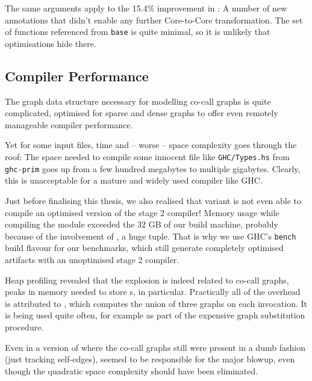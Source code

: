The same arguments apply to the 15.4\% improvement in :
A number of new annotations that didn't enable any further Core-to-Core transformation.
The set of functions referenced from \texttt{base} is quite minimal, so it is unlikely that optimisations hide there.

\subsection{Compiler Performance}\label{sec:compperf}

The graph data structure necessary for modelling co-call graphs is quite complicated, optimised for sparse and dense graphs to offer even remotely manageable compiler performance.

Yet for some input files, time and -- worse -- space complexity goes through the roof:
The space needed to compile some innocent file like \texttt{GHC/Types.hs} from \texttt{ghc-prim} goes up from a few hundred megabytes to multiple gigabytes.
Clearly, this is unacceptable for a mature and widely used compiler like GHC.

Just before finalising this thesis, we also realised that variant \varfull is not even able to compile an optimised version of the stage 2 compiler!
Memory usage while compiling the  module exceeded the 32 GB of our build machine, probably because of the involvement of , a huge tuple.
That is why we use GHC's \texttt{bench} build flavour for our benchmarks, which still generate completely optimised artifacts with an unoptimised stage 2 compiler.

Heap profiling revealed that the explosion is indeed related to co-call graphs, peaks in memory needed to store s, in particular.
Practically all of the overhead is attributed to , which computes the union of three graphs on each invocation. 
It is being used quite often, for example as part of the expensive graph substitution procedure.

Even in a version of \varedges where the co-call graphs still were present in a dumb fashion (\eg just tracking self-edges),  seemed to be responsible for the major blowup, even though the quadratic space complexity should have been eliminated.

